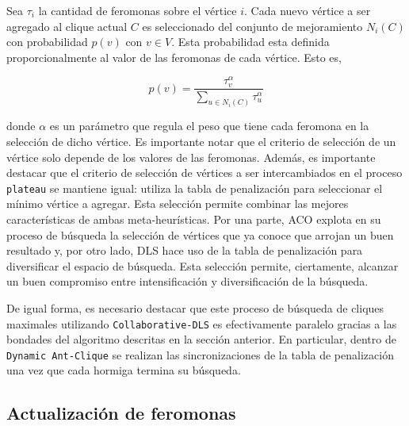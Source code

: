\documentclass[conference]{IEEEtran}
\begin{document}
Sea $\tau_i$ la cantidad de feromonas sobre el vértice $i$. Cada nuevo
vértice a ser agregado al clique actual $C$ es seleccionado del
conjunto de mejoramiento $N_i(C)$ con probabilidad $p(v)$ con $v \in
V$. Esta probabilidad esta definida proporcionalmente al valor de las
feromonas de cada vértice. Esto es,

$$p(v) = \frac{\tau_v^\alpha}{\sum_{u \in N_i(C)} \tau_u^\alpha}$$

donde $\alpha$ es un parámetro que regula el peso que tiene cada
feromona en la selección de dicho vértice. Es importante notar que el
criterio de selección de un vértice solo depende de los valores de las
feromonas. Además, es importante destacar que el criterio de selección
de vértices a ser intercambiados en el proceso \texttt{plateau} se
mantiene igual: utiliza la tabla de penalización para seleccionar el
mínimo vértice a agregar. Esta selección permite combinar las mejores
características de ambas meta-heurísticas. Por una parte, ACO explota
en su proceso de búsqueda la selección de vértices que ya conoce que
arrojan un buen resultado y, por otro lado, DLS hace uso de la tabla
de penalización para diversificar el espacio de búsqueda. Esta
selección permite, ciertamente, alcanzar un buen compromiso entre
intensificación y diversificación de la búsqueda.

De igual forma, es necesario destacar que este proceso de búsqueda de
cliques maximales utilizando \texttt{Collaborative-DLS} es
efectivamente paralelo gracias a las bondades del algoritmo descritas
en la sección anterior. En particular, dentro de \texttt{Dynamic
  Ant-Clique} se realizan las sincronizaciones de la tabla de
penalización una vez que cada hormiga termina su búsqueda.

\subsection{Actualización de feromonas}
\label{sec:aco:feromonas}
\end{document}
